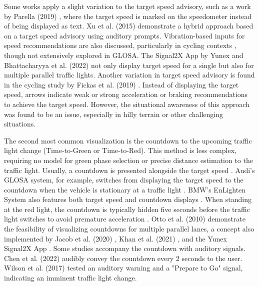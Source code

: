 Some works apply a slight variation to the target speed advisory, such as a work by Parella (2019) \cite{marias_parella_design_2019}, where the target speed is marked on the speedometer instead of being displayed as text. Xu et al. (2015) \cite{xu_bb_2015} demonstrate a hybrid approach based on a target speed advisory using auditory prompts. Vibration-based inputs for speed recommendations are also discussed, particularly in cycling contexts \cite{cespedes_group_2019}, though not extensively explored in GLOSA. The Signal2X App by Yunex \cite{yunex_traffic_v2x-kommunikation_2023} and Bhattacharyya et al. (2022) \cite{bhattacharyya_assessing_2022} not only display target speed for a single but also for multiple parallel traffic lights. Another variation in target speed advisory is found in the cycling study by Fickas et al. (2019) \cite{fickas_fast_2019}. Instead of displaying the target speed, arrows indicate weak or strong acceleration or braking recommendations to achieve the target speed. However, the situational awareness of this approach was found to be an issue, especially in hilly terrain or other challenging situations.

The second most common visualization is the countdown to the upcoming traffic light change (Time-to-Green or Time-to-Red). This method is less complex, requiring no model for green phase selection or precise distance estimation to the traffic light. Usually, a countdown is presented alongside the target speed \cite{koukoumidis_signalguru_2011, koukoumidis_leveraging_2012}. Audi's GLOSA system, for example, switches from displaying the target speed to the countdown when the vehicle is stationary at a traffic light \cite{zweck_traffic_2013}. BMW's EnLighten System also features both target speed and countdown displays \cite{sokolov_effects_2018}. When standing at the red light, the countdown is typically hidden five seconds before the traffic light switches to avoid premature acceleration \cite{stahlmann_exploring_2018, sokolov_effects_2018}. Otto et al. (2010) \cite{otto_operating_2010} demonstrate the feasibility of visualizing countdowns for multiple parallel lanes, a concept also implemented by Jacob et al. (2020) \cite{jacob_ivs-kom_2020}, Khan et al. (2021) \cite{khan_eco-drive_2021}, and the Yunex Signal2X App \cite{yunex_traffic_v2x-kommunikation_2023}. Some studies accompany the countdown with auditory signals. Chen et al. (2022) \cite{chen_developing_2022} audibly convey the countdown every 2 seconds to the user. Wilson et al. (2017) \cite{wilson_driver_2017} tested an auditory warning and a "Prepare to Go" signal, indicating an imminent traffic light change.

